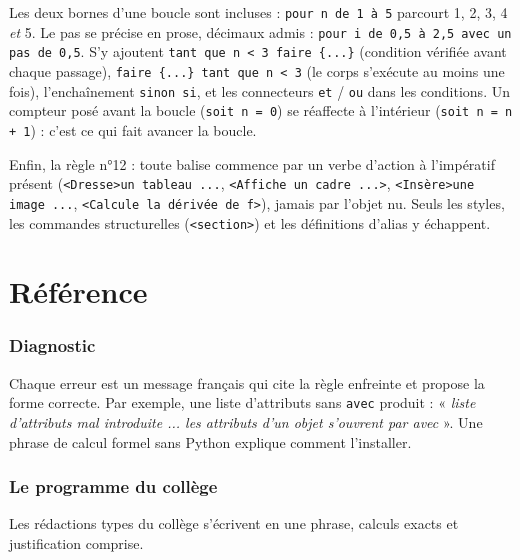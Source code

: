 \documentclass[11pt,a4paper]{article}
\newcommand{\bal}[1]{\texttt{#1}}
\begin{document}
Les deux bornes d'une boucle sont incluses : \bal{pour n de 1 à 5}
parcourt 1, 2, 3, 4 \emph{et} 5. Le pas se précise en prose,
décimaux admis : \bal{pour i de 0,5 à 2,5 avec un pas de 0,5}.
S'y ajoutent \bal{tant que n < 3 faire \{...\}} (condition vérifiée
avant chaque passage), \bal{faire \{...\} tant que n < 3} (le corps
s'exécute au moins une fois), l'enchaînement \bal{sinon si}, et les
connecteurs \bal{et} / \bal{ou} dans les conditions. Un compteur posé
avant la boucle (\bal{soit n = 0}) se réaffecte à l'intérieur
(\bal{soit n = n + 1}) : c'est ce qui fait avancer la boucle.

Enfin, la règle n°12 : toute balise commence par un verbe d'action à
l'impératif présent (\bal{<Dresse>un tableau ...}, \bal{<Affiche un
cadre ...>}, \bal{<Insère>une image ...}, \bal{<Calcule la dérivée
de f>}), jamais par l'objet nu. Seuls les styles, les commandes
structurelles (\bal{<section>}) et les définitions d'alias y
échappent.

\part{Référence}

\section{Diagnostic}

Chaque erreur est un message français qui cite la règle enfreinte et
propose la forme correcte. Par exemple, une liste d'attributs sans
\bal{avec} produit : « \textit{liste d'attributs mal introduite ... les
attributs d'un objet s'ouvrent par avec} ». Une phrase de calcul
formel sans Python explique comment l'installer.

\section{Le programme du collège}

Les rédactions types du collège s'écrivent en une
phrase, calculs exacts et justification comprise.
\end{document}
